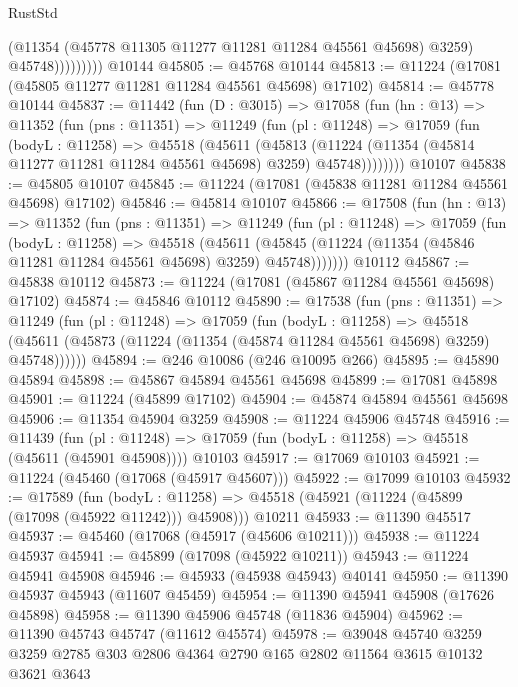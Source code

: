 \begin{lexlean}{RustStd}
\begin{coremodule}
                      (@11354 (@45778 @11305 @11277 @11281 @11284 @45561 @45698) @3259)
                      @45748)))))))))
    @10144
@45805 := @45768 @10144
@45813 := @11224 (@17081 (@45805 @11277 @11281 @11284 @45561 @45698) @17102)
@45814 := @45778 @10144
@45837 := @11442
    (fun (D : @3015) =>
    @17058
      (fun (hn : @13) =>
      @11352
        (fun (pns : @11351) =>
        @11249
          (fun (pl : @11248) =>
          @17059
            (fun (bodyL : @11258) =>
            @45518
              (@45611
                (@45813
                  (@11224 (@11354 (@45814 @11277 @11281 @11284 @45561 @45698) @3259) @45748))))))))
    @10107
@45838 := @45805 @10107
@45845 := @11224 (@17081 (@45838 @11281 @11284 @45561 @45698) @17102)
@45846 := @45814 @10107
@45866 := @17508
    (fun (hn : @13) =>
    @11352
      (fun (pns : @11351) =>
      @11249
        (fun (pl : @11248) =>
        @17059
          (fun (bodyL : @11258) =>
          @45518
            (@45611
              (@45845 (@11224 (@11354 (@45846 @11281 @11284 @45561 @45698) @3259) @45748)))))))
    @10112
@45867 := @45838 @10112
@45873 := @11224 (@17081 (@45867 @11284 @45561 @45698) @17102)
@45874 := @45846 @10112
@45890 := @17538
    (fun (pns : @11351) =>
    @11249
      (fun (pl : @11248) =>
      @17059
        (fun (bodyL : @11258) =>
        @45518 (@45611 (@45873 (@11224 (@11354 (@45874 @11284 @45561 @45698) @3259) @45748))))))
@45894 := @246 @10086 (@246 @10095 @266)
@45895 := @45890 @45894
@45898 := @45867 @45894 @45561 @45698
@45899 := @17081 @45898
@45901 := @11224 (@45899 @17102)
@45904 := @45874 @45894 @45561 @45698
@45906 := @11354 @45904 @3259
@45908 := @11224 @45906 @45748
@45916 := @11439
    (fun (pl : @11248) => @17059 (fun (bodyL : @11258) => @45518 (@45611 (@45901 @45908))))
    @10103
@45917 := @17069 @10103
@45921 := @11224 (@45460 (@17068 (@45917 @45607)))
@45922 := @17099 @10103
@45932 := @17589
    (fun (bodyL : @11258) => @45518 (@45921 (@11224 (@45899 (@17098 (@45922 @11242))) @45908)))
    @10211
@45933 := @11390 @45517
@45937 := @45460 (@17068 (@45917 (@45606 @10211)))
@45938 := @11224 @45937
@45941 := @45899 (@17098 (@45922 @10211))
@45943 := @11224 @45941 @45908
@45946 := @45933 (@45938 @45943) @40141
@45950 := @11390 @45937 @45943 (@11607 @45459)
@45954 := @11390 @45941 @45908 (@17626 @45898)
@45958 := @11390 @45906 @45748 (@11836 @45904)
@45962 := @11390 @45743 @45747 (@11612 @45574)
@45978 := @39048
    @45740
    @3259
    @3259
    @2785
    @303
    @2806
    @4364
    @2790
    @165
    @2802
    @11564
    @3615
    @10132
    @3621
    @3643

\end{coremodule}
\end{lexlean}
